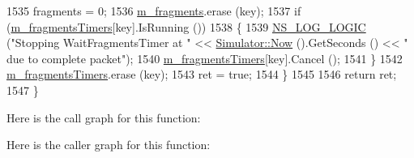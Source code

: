 \begin{DoxyCode}
1535       fragments = 0;
1536       \hyperlink{classns3_1_1Ipv4L3Protocol_a0eb853df4608f63e9447d8a33d427ccf}{m\_fragments}.erase (key);
1537       \textcolor{keywordflow}{if} (\hyperlink{classns3_1_1Ipv4L3Protocol_a3233e1de6e8f43299a353107adafbed2}{m\_fragmentsTimers}[key].IsRunning ())
1538         \{
1539           \hyperlink{group__logging_ga88acd260151caf2db9c0fc84997f45ce}{NS\_LOG\_LOGIC} (\textcolor{stringliteral}{"Stopping WaitFragmentsTimer at "} << 
      \hyperlink{classns3_1_1Simulator_ac3178fa975b419f7875e7105be122800}{Simulator::Now} ().GetSeconds () << \textcolor{stringliteral}{" due to complete packet"});
1540           \hyperlink{classns3_1_1Ipv4L3Protocol_a3233e1de6e8f43299a353107adafbed2}{m\_fragmentsTimers}[key].Cancel ();
1541         \}
1542       \hyperlink{classns3_1_1Ipv4L3Protocol_a3233e1de6e8f43299a353107adafbed2}{m\_fragmentsTimers}.erase (key);
1543       ret = \textcolor{keyword}{true};
1544     \}
1545 
1546   \textcolor{keywordflow}{return} ret;
1547 \}
\end{DoxyCode}


Here is the call graph for this function\+:




Here is the caller graph for this function\+:


